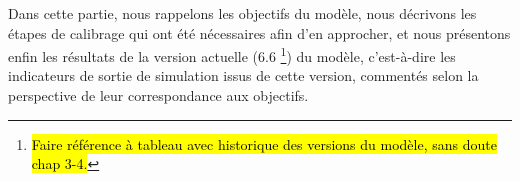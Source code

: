 Dans cette partie, nous rappelons les objectifs du modèle, nous décrivons les étapes de calibrage qui ont été nécessaires afin d'en approcher, et nous présentons enfin les résultats de la version actuelle (6.6
\footnote{
	\hl{Faire référence à tableau avec historique des versions du modèle, sans doute chap 3-4.}
}) du modèle, c'est-à-dire les indicateurs de sortie de simulation issus de cette version, commentés selon la perspective de leur correspondance aux objectifs.
%
%
%
%
%
